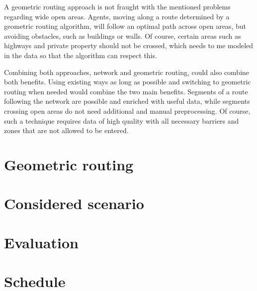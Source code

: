 \documentclass[
	a4paper,
	11pt,
	twoside,
	twocolumn
]{article}
\begin{document}
		A geometric routing approach is not fraught with the mentioned problems regarding wide open areas.
		Agents, moving along a route determined by a geometric routing algorithm, will follow an optimal path across open areas, but avoiding obstacles, such as buildings or walls.
		Of course, certain areas such as highways and private property should not be crossed, which needs to me modeled in the data so that the algorithm can respect this.
		
		Combining both approaches, network and geometric routing, could also combine both benefits.
		Using existing ways as long as possible and switching to geometric routing when needed would combine the two main benefits.
		Segments of a route following the network are possible and enriched with useful data, while segments crossing open areas do not need additional and manual preprocessing.
		Of course, such a technique requires data of high quality with all necessary barriers and zones that are not allowed to be entered.
		
	\section{Geometric routing}
	
		
		
		
	\section{Considered scenario}
	
		
	\section{Evaluation}
	
		
	
	\section{Schedule}
	
	
	\printbibliography
\end{document}

